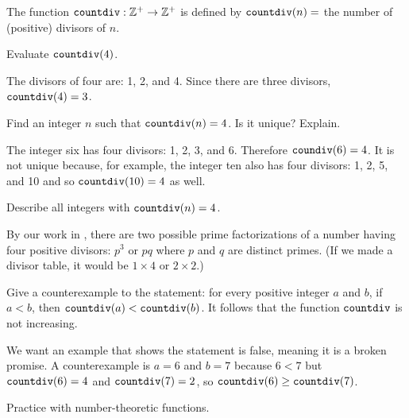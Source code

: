 \begin{exam}
\label{exam_coundiv}
    The function $\texttt{countdiv}: \mathbb{Z}^+ \to \mathbb{Z}^+$ is defined by
    $\texttt{countdiv}(n)=$ the number of (positive) divisors of $n$.  
        \begin{apart}
            \item Evaluate $\texttt{countdiv}(4)$.
                \begin{soln}
                    The divisors of four are: 1, 2, and 4.  Since there are three divisors, $\texttt{countdiv}(4)=3$.
                \end{soln}
            \item Find an integer $n$ such that $\texttt{countdiv}(n) = 4$.  Is it unique?  Explain.
                \begin{soln}
                    The integer six has four divisors: 1, 2, 3, and 6.  Therefore $\texttt{coundiv}(6)=4$.  It is not unique because, for example, the integer ten also has four divisors: 1, 2, 5, and 10 and so $\texttt{countdiv}(10)=4$ as well.
                \end{soln}
            \item Describe all integers with $\texttt{countdiv}(n) = 4$.
                \begin{soln}
                    By our work in , there are two possible prime factorizations of a number having four positive divisors:  $p^3$ or $pq$ where $p$ and $q$ are distinct primes.  (If we made a divisor table, it would be $1 \times 4$ or $2 \times 2$.)
                \end{soln}
            \item Give a counterexample to the statement: for every positive integer $a$ and $b$, if $a<b$, then $\texttt{countdiv}(a) < \texttt{countdiv}(b)$.  It follows that the function $\texttt{countdiv}$ is not increasing.
                \begin{soln}
                  We want an example that shows the statement is false, meaning it is a broken promise.  A counterexample is $a=6$ and $b=7$ because $6 < 7$ but $\texttt{countdiv}(6)=4$ and $\texttt{countdiv}(7) = 2$, so $\texttt{countdiv}(6) \ge \texttt{countdiv}(7)$.
                \end{soln}
        \end{apart}
\end{exam}

Practice with number-theoretic functions.

